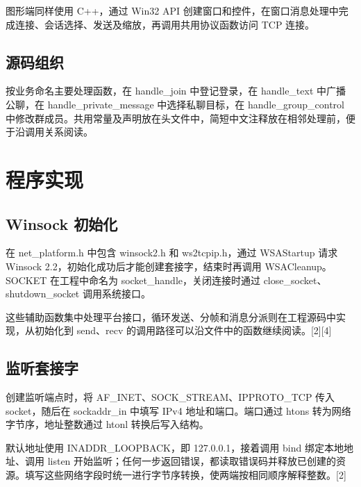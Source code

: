 \documentclass[UTF8,a4paper,10pt,fontset=fandol]{ctexart}
\begin{document}
图形端同样使用 C++，通过 Win32 API 创建窗口和控件，在窗口消息处理中完成连接、会话选择、发送及缩放，再调用共用协议函数访问 TCP 连接。

\subsection{源码组织}
按业务命名主要处理函数，在 handle\_join 中登记登录，在 handle\_text 中广播公聊，在 handle\_private\_message 中选择私聊目标，在 handle\_group\_control 中修改群成员。共用常量及声明放在头文件中，简短中文注释放在相邻处理前，便于沿调用关系阅读。

\medskip
{}
\section{程序实现}
\subsection{Winsock 初始化}
在 net\_platform.h 中包含 winsock2.h 和 ws2tcpip.h，通过 WSAStartup 请求 Winsock 2.2，初始化成功后才能创建套接字，结束时再调用 WSACleanup。SOCKET 在工程中命名为 socket\_handle，关闭连接时通过 close\_socket、shutdown\_socket 调用系统接口。

\medskip
这些辅助函数集中处理平台接口，循环发送、分帧和消息分派则在工程源码中实现，从初始化到 send、recv 的调用路径可以沿文件中的函数继续阅读。[2][4]

\subsection{监听套接字}
创建监听端点时，将 AF\_INET、SOCK\_STREAM、IPPROTO\_TCP 传入 socket，随后在 sockaddr\_in 中填写 IPv4 地址和端口。端口通过 htons 转为网络字节序，地址整数通过 htonl 转换后写入结构。

\medskip
默认地址使用 INADDR\_LOOPBACK，即 127.0.0.1，接着调用 bind 绑定本地地址、调用 listen 开始监听；任何一步返回错误，都读取错误码并释放已创建的资源。填写这些网络字段时统一进行字节序转换，使两端按相同顺序解释整数。[2]
\end{document}
